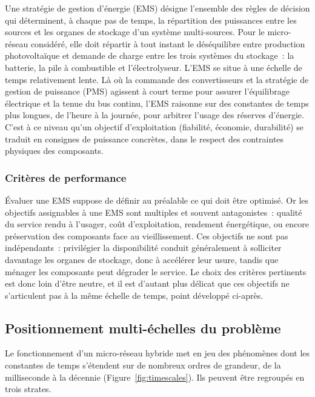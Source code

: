 Une stratégie de gestion d'énergie (EMS) désigne l'ensemble des règles de décision qui déterminent, à chaque pas de temps, la répartition des puissances entre les sources et les organes de stockage d'un système multi-sources.
Pour le micro-réseau considéré, elle doit répartir à tout instant le déséquilibre entre production photovoltaïque et demande de charge entre les trois systèmes du stockage~: la batterie, la pile à combustible et l'électrolyseur.
L'EMS se situe à une échelle de temps relativement lente.
Là où la commande des convertisseurs et la stratégie de gestion de puissance (PMS) agissent à court terme pour assurer l'équilibrage électrique et la tenue du bus continu, l'EMS raisonne sur des constantes de temps plus longues, de l'heure à la journée, pour arbitrer l'usage des réserves d'énergie.
C'est à ce niveau qu'un objectif d'exploitation (fiabilité, économie, durabilité) se traduit en consignes de puissance concrètes, dans le respect des contraintes physiques des composants.

\subsubsection{Critères de performance}

Évaluer une EMS suppose de définir au préalable ce qui doit être optimisé.
Or les objectifs assignables à une EMS sont multiples et souvent antagonistes~: qualité du service rendu à l'usager, coût d'exploitation, rendement énergétique, ou encore préservation des composants face au vieillissement.
Ces objectifs ne sont pas indépendants~: privilégier la disponibilité conduit généralement à solliciter davantage les organes de stockage, donc à accélérer leur usure, tandis que ménager les composants peut dégrader le service.
Le choix des critères pertinents est donc loin d'être neutre, et il est d'autant plus délicat que ces objectifs ne s'articulent pas à la même échelle de temps, point développé ci-après.

\subsection{Positionnement multi-échelles du problème}

Le fonctionnement d'un micro-réseau hybride met en jeu des phénomènes dont les constantes de temps s'étendent sur de nombreux ordres de grandeur, de la milliseconde à la décennie (Figure~\ref{fig:timescales}).
Ils peuvent être regroupés en trois strates.

